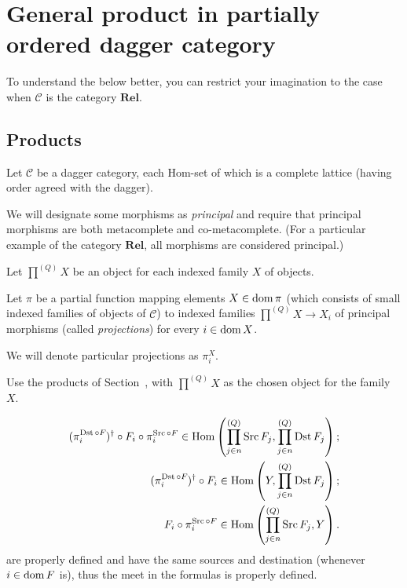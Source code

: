 \section{General product in partially ordered dagger category}

To understand the below better, you can restrict your imagination to the case
when $\mathcal{C}$ is the category $\mathbf{Rel}$.

\subsection{Products}

Let $\mathcal{C}$ be a dagger category, each Hom-set of which is a complete
lattice (having order agreed with the dagger).

We will designate some morphisms as \emph{principal} and require that
principal morphisms are both metacomplete and co-metacomplete. (For a
particular example of the category $\mathbf{Rel}$, all morphisms are
considered principal.)

Let $\prod^{(Q)} X$ be an object for each indexed family $X$ of objects.

Let $\pi$ be a partial function mapping elements $X \in \operatorname{dom} \pi$ (which
consists of small indexed families of objects of $\mathcal{C}$) to indexed
families $\prod^{(Q)} X \rightarrow X_i$ of principal morphisms (called
\emph{projections}) for every $i \in \operatorname{dom} X$.

We will denote particular projections as $\pi^X_i$.

Use the products of
Section~, with
$\prod^{(Q)}X$ as the chosen object for the family $X$.

\begin{rem}
  \begin{align*}
  (\pi^{\operatorname{Dst} \circ
   F_{}}_i)^{\dagger} \circ F_i \circ \pi^{\operatorname{Src} \circ F}_i \in \operatorname{Hom} \left(
  \prod^{(Q)}_{j \in n} \operatorname{Src} F_j , \prod^{(Q)}_{j \in n} \operatorname{Dst} F_j
  \right);\\
  (\pi^{\operatorname{Dst} \circ
   F_{}}_i)^{\dagger} \circ F_i \in \operatorname{Hom} \left(
  Y , \prod^{(Q)}_{j \in n} \operatorname{Dst} F_j
  \right);\\
F_i \circ \pi^{\operatorname{Src} \circ F}_i \in \operatorname{Hom} \left(
  \prod^{(Q)}_{j \in n} \operatorname{Src} F_j , Y \right).
  \end{align*}
  are properly defined and have the same sources and destination
  (whenever $i \in \operatorname{dom} F$ is), thus the meet in the formulas is
  properly defined.
\end{rem}

